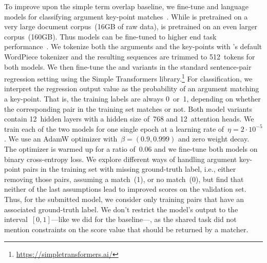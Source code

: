 To improve upon the simple term overlap baseline, we fine-tune \Bert and \Roberta language models for classifying argument key-point matches~\cite{DevlinCLT2019,LiuOGDJCLLZS2019}.
While \Bert is pretrained on a very large document corpus~(16GB of raw data), \Roberta is pretrained on an even larger corpus~(160GB).
Thus \Roberta models can be fine-tuned to higher end task performance~\cite{LiuOGDJCLLZS2019}.
We tokenize both the arguments and the key-points with \Bert's default WordPiece tokenizer and the resulting sequences are trimmed to 512~tokens for both models.
We then fine-tune the \BertBase and \RobertaBase variants in the standard sentence-pair regression setting using the Simple Transformers library.\footnote{\url{https://simpletransformers.ai/}}
For classification, we interpret the regression output value as the probability of an argument matching a key-point.
That is, the training labels are always 0~or~1, depending on whether the corresponding pair in the training set matches or not.
Both model variants contain 12~hidden layers with a hidden size of~768 and 12~attention heads.
We train each of the two models for one single epoch at a learning rate of~\( \eta = 2 \cdot 10^{-5} \).
We use an AdamW optimizer with~\( \beta = (0.9, 0.999) \) and zero weight decay.
The optimizer is warmed up for a ratio of~0.06 and we fine-tune both models on binary cross-entropy loss.
We explore different ways of handling argument key-point pairs in the training set with missing ground-truth label, i.e., either removing those pairs, assuming a match~(1), or no match~(0), but find that neither of the last assumptions lead to improved scores on the validation set.
Thus, for the submitted model, we consider only training pairs that have an associated ground-truth label.
We don't restrict the model's output to the interval~\([0,1]\)---like we did for the baseline---, as the shared task did not mention constraints on the score value that should be returned by a matcher.
